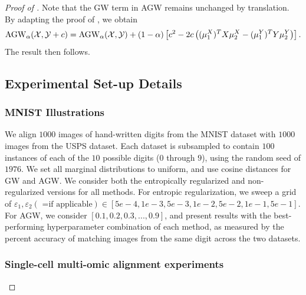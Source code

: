 \begin{proof}[Proof of ]
Note that the GW term in AGW remains unchanged by translation.
By adapting the proof of , we obtain
\begin{align}
    \text{AGW}_{\alpha}(\mathcal X, \mathcal Y + c) = \text{AGW}_{\alpha}(\mathcal X, \mathcal Y) + (1 - \alpha) \left[ c^2
    - 2 c \left( (\mu_1^X)^T X \mu_2^X - (\mu_1^Y)^T Y \mu_2^Y \right) \right].
\end{align}
The result then follows.

\subsection{Experimental Set-up Details} \label{subsec:appendix_expe_agw}

\subsubsection{MNIST Illustrations} We align $1000$ images of hand-written digits from
the MNIST dataset with $1000$ images from the USPS dataset. Each dataset is subsampled to
contain $100$ instances of each of the $10$ possible digits ($0$ through $9$),
using the random seed of $1976$. We set all marginal distributions to uniform,
and use cosine distances for GW and AGW. We consider both the entropically regularized and
non-regularized versions for all methods. For entropic regularization, we sweep a grid of
$\varepsilon_1, \varepsilon_2 (\textrm{ =if applicable}) \in [5e-4, 1e-3, 5e-3, 1e-2, 5e-2, 1e-1, 5e-1]$.
For AGW, we consider $[0.1, 0.2, 0.3, ..., 0.9]$, and present results with the best-performing
hyperparameter combination of each method, as measured by the percent accuracy of matching images
from the same digit across the two datasets.

\subsubsection{Single-cell multi-omic alignment experiments}


\end{proof}
